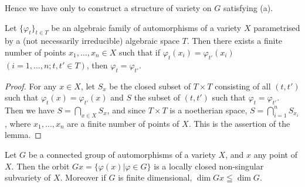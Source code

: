 Hence we have only to construct a structure of variety on $G$ satisfying (a). 

\begin{lem}\label{art6-lem1}%
Let $\{\varphi_t\}_{t \in T}$ be an algebraic family of automorphisms of a variety $X$ parametrised by a (not necessarily irreducible) algebraic space $T$. Then there exists a finite number of points $x_1,\ldots, x_n \in X$ such that if $\varphi_t (x_i) = \varphi_{t'} (x_i)$ $(i = 1, \ldots, n; t, t' \in T)$, then $\varphi_t = \varphi_{t'}$.
\end{lem}

\begin{proof}
For any $x \in X$, let $S_x$ be the closed subset of $T \times T$ consisting of all $(t, t')$ such that $\varphi_t (x) = \varphi_{t'} (x)$ and $S$ the subset of $(t, t')$ such that $\varphi_t = \varphi_{t'}$. Then we have $S = \bigcap\limits_{x \in X} S_x$, and since $T \times T$ is a noetherian space, $S = \bigcap\limits^n_{i=1} S_{x_i}$, where $x_1, \ldots, x_n$ are a finite number of points of $X$. This is the assertion of the lemma.
\end{proof}

\begin{lem}\label{art6-lem2}%
Let $G$ be a connected group of automorphisms of a variety $X$, and $x$ any point of $X$. Then the orbit $G x = \{\varphi (x)| \varphi \in G \}$ is a locally closed non-singular subvariety of $X$. Moreover if $G$ is finite dimensional, $\dim G x \leqq \dim G$.
\end{lem}

